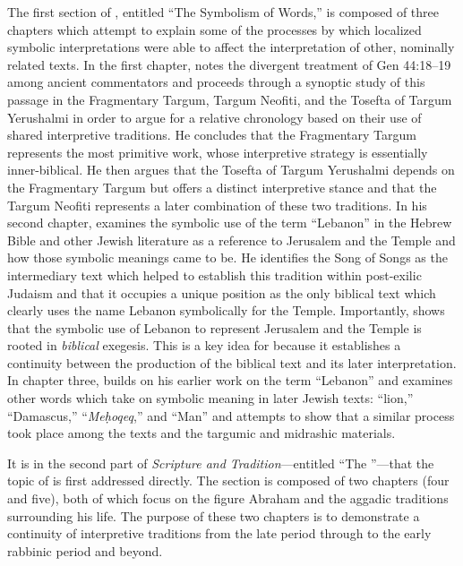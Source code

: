 The first section of , entitled ``The Symbolism of Words,'' is composed of three chapters which attempt to explain some of the processes by which localized symbolic interpretations were able to affect the interpretation of other, nominally related texts.
%
In the first chapter, \vermes notes the divergent treatment of Gen 44:18--19 among ancient commentators and proceeds through a synoptic study of this passage in the Fragmentary Targum, Targum Neofiti, and the Tosefta of Targum Yerushalmi in order to argue for a relative chronology based on their use of shared interpretive traditions. He concludes that the Fragmentary Targum represents the most primitive work, whose interpretive strategy is essentially inner-biblical. He then argues that the Tosefta of Targum Yerushalmi depends on the Fragmentary Targum but offers a distinct interpretive stance and that the Targum Neofiti represents a later combination of these two traditions.
%
In his second chapter, \vermes examines the symbolic use of the term ``Lebanon'' in the Hebrew Bible and other Jewish literature as a reference to Jerusalem and the Temple and how those symbolic meanings came to be. He identifies the Song of Songs as the intermediary text which helped to establish this tradition within post-exilic Judaism and that it occupies a unique position as the only biblical text which clearly uses the name Lebanon symbolically for the Temple. Importantly, \vermes shows that the symbolic use of Lebanon to represent Jerusalem and the Temple is rooted in \emph{biblical} exegesis. This is a key idea for \vermes because it establishes a continuity between the production of the biblical text and its later interpretation.
%
In chapter three, \vermes builds on his earlier work on the term ``Lebanon'' and examines other words which take on symbolic meaning in later Jewish texts: ``lion,'' ``Damascus,'' ``\emph{Meḥoqeq},'' and ``Man'' and attempts to show that a similar process took place among the \dss texts and the targumic and midrashic materials. 

It is in the second part of \emph{Scripture and Tradition}---entitled ``The \RwB''---that the topic of \RwB is first addressed directly. The section is composed of two chapters (four and five), both of which focus on the figure Abraham and the aggadic traditions surrounding his life. The purpose of these two chapters is to demonstrate a continuity of interpretive traditions from the late \secondtemple period through to the early rabbinic period and beyond. 

